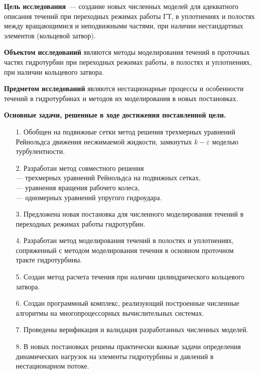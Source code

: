 \textbf{Цель исследования}~--- создание новых численных моделей для адекватного описания 
течений при переходных режимах работы ГТ, в уплотнениях и полостях между 
вращающимися и неподвижными частями, при наличии нестандартных элементов (кольцевой затвор).

\textbf{Объектом исследований} являются методы моделирования течений в проточных частях гидротурбин при 
переходных режимах работы, в полостях и уплотнениях, при наличии кольцевого затвора.

\textbf{Предметом исследований} являются нестационарные процессы и особенности течений в гидротурбинах и 
методов их моделирования в новых постановках.

\textbf{Основные задачи, решенные в ходе достижения поставленной цели.}
\begin{enumerate}
  \setlength{\itemsep}{1pt} \setlength{\parskip}{0pt} \setlength{\parsep}{0pt}
  \item[1.] Обобщен на подвижные сетки метод решения трехмерных уравнений Рейнольдса движения несжимаемой 
            жидкости, замкнутых $k-\varepsilon$ моделью турбулентности.
  \item[2.] Разработан метод совместного решения \\
            --- трехмерных уравнений Рейнольдса на подвижных сетках, \\
            --- уравнения вращения рабочего колеса, \\
            --- одномерных уравнений упругого гидроудара.
  \item[3.] Предложена новая постановка для численного моделирования течений в переходных
            режимах работы гидротурбин.
  \item[4.] Разработан метод моделирования течений в полостях и уплотнениях, сопряженный с методом 
            моделирования течения в основном проточном тракте гидротурбины.
  \item[5.] Создан метод расчета течения при наличии цилиндрического кольцевого затвора.
  \item[6.] Создан программный комплекс, реализующий построенные численные алгоритмы на многопроцессорных 
            вычислительных системах.
  \item[7.] Проведены верификация и валидация разработанных численных моделей.
  \item[8.] В новых постановках решены практически важные задачи определения динамических нагрузок 
            на элементы гидротурбины и давлений в нестационарном потоке.
\end{enumerate}

